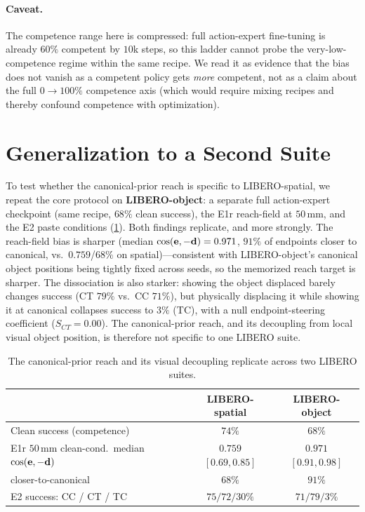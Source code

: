 \paragraph{Caveat.} The competence range here is compressed: full action-expert fine-tuning is already $60\%$ competent by $10$k steps, so this ladder cannot probe the very-low-competence regime within the same recipe. We read it as evidence that the bias does not vanish as a competent policy gets \emph{more} competent, not as a claim about the full $0\!\to\!100\%$ competence axis (which would require mixing recipes and thereby confound competence with optimization).

\section{Generalization to a Second Suite}
\label{sec:generalization}

To test whether the canonical-prior reach is specific to LIBERO-spatial, we repeat the core protocol on \textbf{LIBERO-object}: a separate full action-expert checkpoint (same recipe, $68\%$ clean success), the E1r reach-field at $50$\,mm, and the E2 paste conditions (\cref{tab:suites}). Both findings replicate, and more strongly. The reach-field bias is sharper (median $\operatorname{cos}(\mathbf{e},-\mathbf{d})=0.971$, $91\%$ of endpoints closer to canonical, vs.\ $0.759$/$68\%$ on spatial)---consistent with LIBERO-object's canonical object positions being tightly fixed across seeds, so the memorized reach target is sharper. The dissociation is also starker: showing the object displaced barely changes success (CT $79\%$ vs.\ CC $71\%$), but physically displacing it while showing it at canonical collapses success to $3\%$ (TC), with a null endpoint-steering coefficient ($S_{CT}=0.00$). The canonical-prior reach, and its decoupling from local visual object position, is therefore not specific to one LIBERO suite.

\begin{table}[t]
\centering
\caption{The canonical-prior reach and its visual decoupling replicate across two LIBERO suites.}
\label{tab:suites}
\small
\begin{tabular}{@{}lcc@{}}
\toprule
 & LIBERO-spatial & LIBERO-object \\
\midrule
Clean success (competence) & $74\%$ & $68\%$ \\
E1r $50$\,mm clean-cond.\ median $\operatorname{cos}(\mathbf{e},-\mathbf{d})$ & $0.759$ $[0.69,0.85]$ & $0.971$ $[0.91,0.98]$ \\
\quad closer-to-canonical & $68\%$ & $91\%$ \\
E2 success: CC / CT / TC & $75 / 72 / 30\%$ & $71 / 79 / 3\%$ \\
\bottomrule
\end{tabular}
\end{table}
